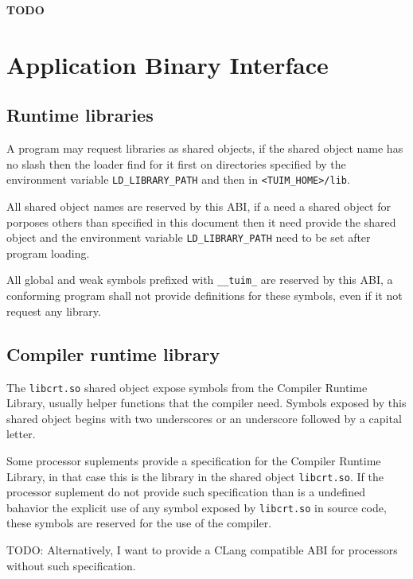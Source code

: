 \documentclass[
   article,                      %
   10pt,                         %
   openright,                    %
   oneside,                      %
   a4paper,                      %
   sumario = tradicional,        %
   english,                      %
   xcolor=table                  %
]{abntex2}
\begin{document}
\textbf{TODO}

\newpage
\section{Application Binary Interface}

\subsection{Runtime libraries}

A program may request libraries as shared objects,
if the shared object name has no slash then the loader find for it
first on directories specified by the environment variable
\texttt{LD\_LIBRARY\_PATH} and then in \texttt{<TUIM\_HOME>/lib}.

All shared object names are reserved by this ABI,
if a  need a shared object for porposes others than
specified in this document then it need provide the shared object and
the environment variable \texttt{LD\_LIBRARY\_PATH} need to be set
after program loading.

All global and weak symbols prefixed with \texttt{\_\_tuim\_}
are reserved by this ABI,
a conforming program shall not provide definitions for these symbols,
even if it not request any library.

\subsection{Compiler runtime library}

The \texttt{libcrt.so} shared object
expose symbols from the Compiler Runtime Library,
usually helper functions that the compiler need.
Symbols exposed by this shared object
begins with two underscores or an underscore followed by a capital letter.

Some processor suplements provide a specification for the
Compiler Runtime Library, in that case this is the library in the shared
object \texttt{libcrt.so}.
If the processor suplement do not provide such specification than
is a undefined bahavior the explicit use of
any symbol exposed by \texttt{libcrt.so} in source code,
these symbols are reserved for the use of the compiler.

TODO: Alternatively, I want to provide a CLang compatible ABI for processors
without such specification.
\end{document}
